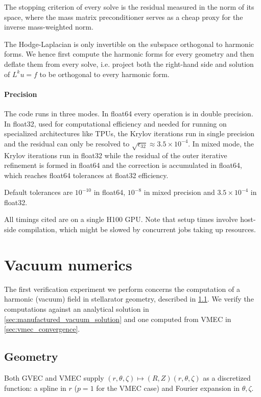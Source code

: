 \documentclass[%
 reprint,
 superscriptaddress,
 amsmath,amssymb,
 aps, nofootinbib, floatfix]{revtex4-2}
\begin{document}
The stopping criterion of every solve is the residual measured in the norm of its space, where the mass matrix preconditioner serves as a cheap proxy for the inverse mass-weighted norm.    

The Hodge-Laplacian is only invertible on the subspace orthogonal to harmonic forms. We hence first compute the harmonic forms for every geometry and then  deflate them from every solve, i.e. project both the right-hand side and solution of $L^k u = f$ to be orthogonal to every harmonic form.

\paragraph{Precision}
The code runs in three modes. In float64 every operation is in double precision. In float32, used for computational efficiency and needed for running on specialized architectures like TPUs, the Krylov iterations run in single precision and the residual can only be resolved to $\sqrt{\epsilon_{32}} \approx 3.5 \times 10^{-4}$. In mixed mode, the Krylov iterations run in float32 while the residual of the outer iterative refinement is formed in float64 and the correction is accumulated in float64, which reaches float64 tolerances at float32 efficiency.

Default tolerances are $10^{-10}$ in float64, $10^{-8}$ in mixed precision and
$3.5\times10^{-4}$ in float32.

\begin{remark}
    All timings cited are on a single H100 GPU. Note that setup times involve host-side compilation, which might be slowed by concurrent jobs taking up resources.
\end{remark}

\section{Vacuum numerics}
\label{sec:numerics_1_vacuum}

The first verification experiment we perform concerns the computation of a harmonic (vacuum) field in stellarator geometry, described in \ref{sec:geometry}. We verify the computations against an analytical solution in \ref{sec:manufactured_vacuum_solution} and one computed from VMEC in \ref{sec:vmec_convergence}.

\subsection{Geometry}
\label{sec:geometry}
Both GVEC and VMEC supply $(r, \theta, \zeta) \mapsto (R, Z)(r, \theta, \zeta)$ as a discretized function: a spline in $r$ ($p=1$ for the VMEC case) and Fourier expansion in $\theta, \zeta$.
\end{document}
